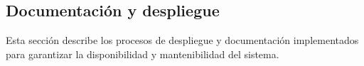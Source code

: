 \subsection{Documentación y despliegue}

Esta sección describe los procesos de despliegue y documentación implementados para garantizar la disponibilidad y mantenibilidad del sistema.



